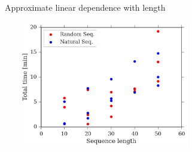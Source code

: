 \documentclass{beamer}
\begin{document}
\begin{frame}[plain]{Approximate linear dependence with length}
\centering
\begin{adjustwidth}{-1.5em}{-2.5em}
\includegraphics[width=330px,height=210px]{../img/lengthVsTime.png} 
\end{adjustwidth}
\end{frame}







% 
% 



\end{document}
